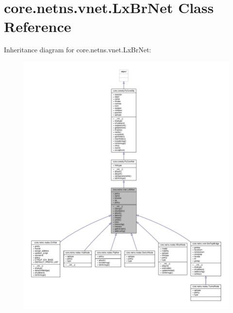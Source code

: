 \hypertarget{classcore_1_1netns_1_1vnet_1_1_lx_br_net}{\section{core.\+netns.\+vnet.\+Lx\+Br\+Net Class Reference}
\label{classcore_1_1netns_1_1vnet_1_1_lx_br_net}
}


Inheritance diagram for core.\+netns.\+vnet.\+Lx\+Br\+Net\+:
\nopagebreak
\begin{figure}[H]
\begin{center}
\leavevmode
\includegraphics[width=350pt]{classcore_1_1netns_1_1vnet_1_1_lx_br_net__inherit__graph}
\end{center}
\end{figure}


